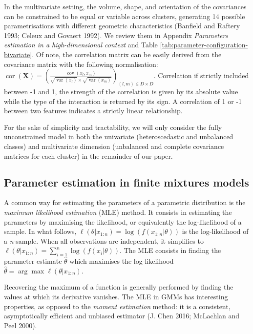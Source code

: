 In the multivariate setting, the volume, shape, and orientation of the covariances can be constrained to be equal or variable across clusters, generating 14 possible parametrisations with different geometric characteristics (Banfield and Raftery 1993; Celeux and Govaert 1992). We review them in Appendix \emph{Parameters estimation in a high-dimensional context} and Table \ref{tab:parameter-configuration-bivariate}. Of note, the
correlation matrix can be easily derived from the covariance
matrix with the following normalisation:
\(\operatorname{cor}(\boldsymbol{X})=\left(\frac{\operatorname{cov}(x_l, x_m)}{\sqrt{\operatorname{var}(x_l)} \times \sqrt{\operatorname{var}(x_m)}}\right)_{(l,m) \in D \times D}\). Correlation if strictly included between -1 and 1, the strength of the
correlation is given by its absolute value while the type of the
interaction is returned by its sign. A correlation of 1 or -1 between two features indicates a strictly linear relationship.

For the sake of simplicity and tractability, we will only consider the
fully unconstrained model in both the univariate (heteroscedastic and
unbalanced classes) and multivariate dimension (unbalanced and complete
covariance matrices for each cluster) in the remainder of our paper.

\hypertarget{parameter-estimation-in-finite-mixtures-models}{%
\subsection{Parameter estimation in finite mixtures models}\label{parameter-estimation-in-finite-mixtures-models}}

A common way for estimating the parameters of a parametric distribution is
the \emph{maximum likelihood estimation} (MLE) method. It consists in
estimating the parameters by maximising the likelihood, or
equivalently the log-likelihood of a sample. In what follows,
\(\ell(\theta|x_{1:n})=\log (f(x_{1:n}|\theta))\) is the log-likelihood of
a \emph{n}-sample. When all observations are independent, it simplifies to
\(\ell(\theta|x_{1:n}) = \sum_{i=1}^n \log (f(x_i|\theta))\). The MLE
consists in finding the parameter estimate \(\hat{\theta}\) which maximises the
log-likelihood \(\hat{\theta} = \arg \max \ell (\theta | x_{1:n})\).

Recovering the maximum of a function is generally performed by
finding the values at which its derivative vanishes. The MLE in GMMs
has interesting properties, as opposed to the \emph{moment estimation}
method: it is a consistent, asymptotically efficient and unbiased
estimator (J. Chen 2016; McLachlan and Peel 2000).

